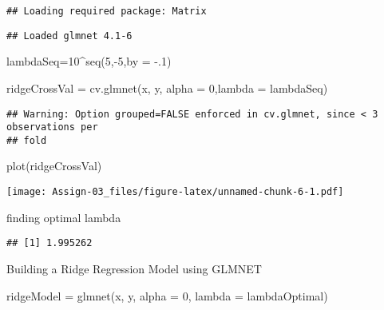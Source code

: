 \documentclass[
]{article}
\newenvironment{Shaded}{\begin{snugshade}}{\end{snugshade}}
\newcommand{\AttributeTok}[1]{\textcolor[rgb]{0.77,0.63,0.00}{#1}}
\newcommand{\CommentTok}[1]{\textcolor[rgb]{0.56,0.35,0.01}{\textit{#1}}}
\newcommand{\DecValTok}[1]{\textcolor[rgb]{0.00,0.00,0.81}{#1}}
\newcommand{\FunctionTok}[1]{\textcolor[rgb]{0.00,0.00,0.00}{#1}}
\newcommand{\NormalTok}[1]{#1}
\newcommand{\OtherTok}[1]{\textcolor[rgb]{0.56,0.35,0.01}{#1}}
\newcommand{\SpecialCharTok}[1]{\textcolor[rgb]{0.00,0.00,0.00}{#1}}
\begin{document}
\begin{verbatim}
## Loading required package: Matrix
\end{verbatim}

\begin{verbatim}
## Loaded glmnet 4.1-6
\end{verbatim}

\begin{Shaded}
\begin{Highlighting}[]
\NormalTok{lambdaSeq}\OtherTok{=}\DecValTok{10}\SpecialCharTok{\^{}}\FunctionTok{seq}\NormalTok{(}\DecValTok{5}\NormalTok{,}\SpecialCharTok{{-}}\DecValTok{5}\NormalTok{,}\AttributeTok{by =} \SpecialCharTok{{-}}\NormalTok{.}\DecValTok{1}\NormalTok{)}


\NormalTok{ridgeCrossVal }\OtherTok{=} \FunctionTok{cv.glmnet}\NormalTok{(x, y, }\AttributeTok{alpha =} \DecValTok{0}\NormalTok{,}\AttributeTok{lambda =}\NormalTok{ lambdaSeq)}
\end{Highlighting}
\end{Shaded}

\begin{verbatim}
## Warning: Option grouped=FALSE enforced in cv.glmnet, since < 3 observations per
## fold
\end{verbatim}

\begin{Shaded}
\begin{Highlighting}[]
\FunctionTok{plot}\NormalTok{(ridgeCrossVal)}
\end{Highlighting}
\end{Shaded}

\texttt{[image: Assign-03\_files/figure-latex/unnamed-chunk-6-1.pdf]}

finding optimal lambda

\begin{Shaded}
\end{Shaded}

\begin{verbatim}
## [1] 1.995262
\end{verbatim}

Building a Ridge Regression Model using GLMNET

\begin{Shaded}
\begin{Highlighting}[]
\NormalTok{ridgeModel }\OtherTok{=} \FunctionTok{glmnet}\NormalTok{(x, y, }\AttributeTok{alpha =} \DecValTok{0}\NormalTok{, }\AttributeTok{lambda  =}\NormalTok{ lambdaOptimal)}
\end{Highlighting}
\end{Shaded}
\end{document}
